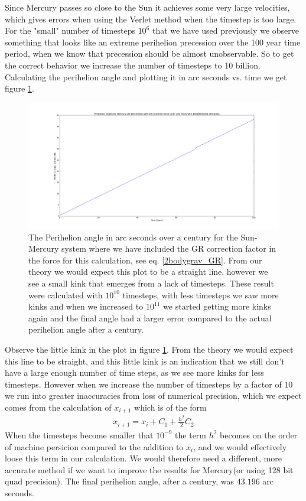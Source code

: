 \documentclass[a4paper,11pt]{article}
\begin{document}
{Since Mercury passes so close to the Sun it achieves some very large velocities, which gives errors when using the Verlet method when the timestep is too large. For the "small" number of timesteps $10^{6}$ that we have used previously we observe something that looks like an extreme perihelion precession over the 100 year time period, when we know that precession should be almost unobservable. So to get the correct behavior we increase the number of timesteps to 10 billion. Calculating the perihelion angle and plotting it in arc seconds vs. time we get figure \ref{fig:perihelion}.


\begin{figure}[H]
	\centering
	\includegraphics[scale=0.35]{figure_2}
	\caption{The Perihelion angle in arc seconds over a century for the Sun-Mercury system where we have included the GR correction factor in the force for this calculation, see eq. \ref{2bodygrav_GR}. From our theory we would expect this plot to be a straight line, however we see a small kink that emerges from a lack of timesteps. These result were calculated with $10^{10}$ timesteps, with less timesteps we saw more kinks and when we increased to $10^{11}$ we started getting more kinks again and the final angle had a larger error compared to the actual perihelion angle after a century.}
	\label{fig:perihelion}
\end{figure}

Observe the little kink in the plot in figure \ref{fig:perihelion}. From the theory we would expect this line to be straight, and this little kink is an indication that we still don't have a large enough number of time steps, as we see more kinks for less timesteps. However when we increase the number of timesteps by a factor of 10 we run into greater inaccuracies from loss of numerical precision, which we expect comes from the calculation of $x_{i+1}$ which is of the form
\begin{align}
	x_{i+1} = x_i + C_1 + \frac{h^2}{2} C_2
\end{align} 
When the timesteps become smaller that $10^{-9}$ the term $h^2$ becomes on the order of machine persicion compared to the addition to $x_i$, and we would effectively loose this term in our calculation. We would therefore need a different, more accurate method if we want to improve the results for Mercury(or using 128 bit quad precision).  The final perihelion angle, after a century, was $43.196$ arc seconds.


}
\end{document}
